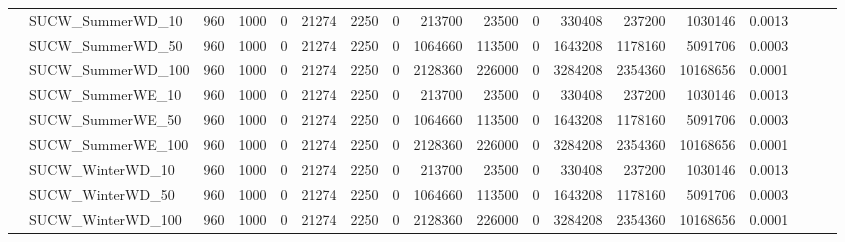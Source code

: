\begin{table}[h]
{\begin{tabular}{llrrrrrrrrrrrrrlll}
			& SUCW\_SummerWD\_10           & 960          & 1000        & 0          & 21274        & 2250        & 0          & 213700  & 23500    & 0      & 330408  & 237200   & 1030146    & 0.0013    &                          &                          &                          \\
			& SUCW\_SummerWD\_50           & 960          & 1000        & 0          & 21274        & 2250        & 0          & 1064660 & 113500   & 0      & 1643208 & 1178160  & 5091706    & 0.0003    &                          &                          &                          \\
			& SUCW\_SummerWD\_100          & 960          & 1000        & 0          & 21274        & 2250        & 0          & 2128360 & 226000   & 0      & 3284208 & 2354360  & 10168656   & 0.0001    &                          &                          &                          \\
			& SUCW\_SummerWE\_10           & 960          & 1000        & 0          & 21274        & 2250        & 0          & 213700  & 23500    & 0      & 330408  & 237200   & 1030146    & 0.0013    &                          &                          &                          \\
			& SUCW\_SummerWE\_50           & 960          & 1000        & 0          & 21274        & 2250        & 0          & 1064660 & 113500   & 0      & 1643208 & 1178160  & 5091706    & 0.0003    &                          &                          &                          \\
			& SUCW\_SummerWE\_100          & 960          & 1000        & 0          & 21274        & 2250        & 0          & 2128360 & 226000   & 0      & 3284208 & 2354360  & 10168656   & 0.0001    &                          &                          &                          \\
			& SUCW\_WinterWD\_10           & 960          & 1000        & 0          & 21274        & 2250        & 0          & 213700  & 23500    & 0      & 330408  & 237200   & 1030146    & 0.0013    &                          &                          &                          \\
			& SUCW\_WinterWD\_50           & 960          & 1000        & 0          & 21274        & 2250        & 0          & 1064660 & 113500   & 0      & 1643208 & 1178160  & 5091706    & 0.0003    &                          &                          &                          \\
			& SUCW\_WinterWD\_100          & 960          & 1000        & 0          & 21274        & 2250        & 0          & 2128360 & 226000   & 0      & 3284208 & 2354360  & 10168656   & 0.0001    &                          &                          &                          \\

\end{tabular}}
\end{table}
